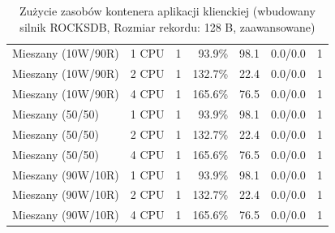 \begin{table}[ht]
{\begin{tabular}{llcrrcc}
Mieszany (10W/90R) & 1 CPU & 1 & 93.9\% & 98.1 & 0.0/0.0 & 1 \\
Mieszany (10W/90R) & 2 CPU & 1 & 132.7\% & 22.4 & 0.0/0.0 & 1 \\
Mieszany (10W/90R) & 4 CPU & 1 & 165.6\% & 76.5 & 0.0/0.0 & 1 \\
Mieszany (50/50) & 1 CPU & 1 & 93.9\% & 98.1 & 0.0/0.0 & 1 \\
Mieszany (50/50) & 2 CPU & 1 & 132.7\% & 22.4 & 0.0/0.0 & 1 \\
Mieszany (50/50) & 4 CPU & 1 & 165.6\% & 76.5 & 0.0/0.0 & 1 \\
Mieszany (90W/10R) & 1 CPU & 1 & 93.9\% & 98.1 & 0.0/0.0 & 1 \\
Mieszany (90W/10R) & 2 CPU & 1 & 132.7\% & 22.4 & 0.0/0.0 & 1 \\
Mieszany (90W/10R) & 4 CPU & 1 & 165.6\% & 76.5 & 0.0/0.0 & 1 \\
\bottomrule
\end{tabular}%
}
\caption{Zużycie zasobów kontenera aplikacji klienckiej (wbudowany silnik ROCKSDB, Rozmiar rekordu: 128 B, zaawansowane)}
\label{tab:resources_rocksdb_small_0}
\end{table}
